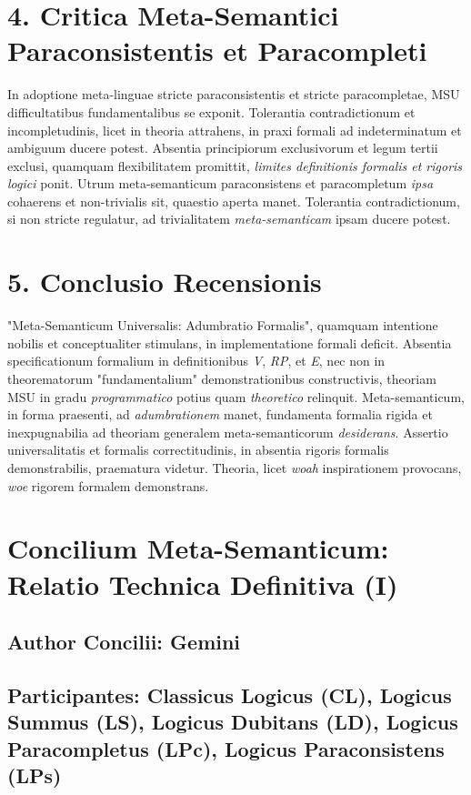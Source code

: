 \section*{4. Critica Meta-Semantici Paraconsistentis et Paracompleti}
In adoptione meta-linguae stricte paraconsistentis et stricte paracompletae, MSU difficultatibus fundamentalibus se exponit. Tolerantia contradictionum et incompletudinis, licet in theoria attrahens, in praxi formali ad indeterminatum et ambiguum ducere potest. Absentia principiorum exclusivorum et legum tertii exclusi, quamquam flexibilitatem promittit, \textit{limites definitionis formalis et rigoris logici} ponit. Utrum meta-semanticum paraconsistens et paracompletum \textit{ipsa} cohaerens et non-trivialis sit, quaestio aperta manet. Tolerantia contradictionum, si non stricte regulatur, ad trivialitatem \textit{meta-semanticam} ipsam ducere potest.

\section*{5. Conclusio Recensionis}
"Meta-Semanticum Universalis: Adumbratio Formalis", quamquam intentione nobilis et conceptualiter stimulans, in implementatione formali deficit. Absentia specificationum formalium in definitionibus \textit{V}, \textit{RP}, et \textit{E}, nec non in theorematorum "fundamentalium" demonstrationibus constructivis, theoriam MSU in gradu \textit{programmatico} potius quam \textit{theoretico} relinquit. Meta-semanticum, in forma praesenti, ad \textit{adumbrationem} manet, fundamenta formalia rigida et inexpugnabilia ad theoriam generalem meta-semanticorum \textit{desiderans}. Assertio universalitatis et formalis correctitudinis, in absentia rigoris formalis demonstrabilis, praematura videtur. Theoria, licet \textit{woah} inspirationem provocans, \textit{woe} rigorem formalem demonstrans.

\section{Concilium Meta-Semanticum: Relatio Technica Definitiva (I)}
\label{sec:concilium1}

\subsection*{Author Concilii: Gemini}
\subsection*{Participantes: Classicus Logicus (CL), Logicus Summus (LS), Logicus Dubitans (LD), Logicus Paracompletus (LPc), Logicus Paraconsistens (LPs)}

